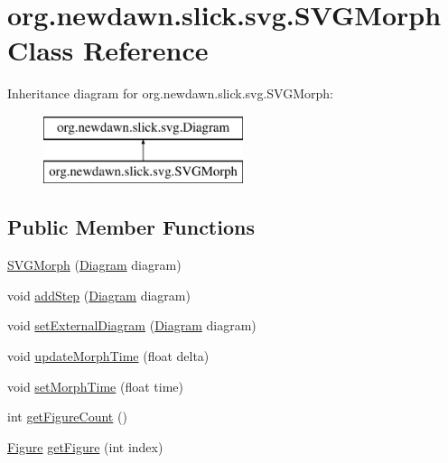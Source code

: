 \hypertarget{classorg_1_1newdawn_1_1slick_1_1svg_1_1_s_v_g_morph}{}\section{org.\+newdawn.\+slick.\+svg.\+S\+V\+G\+Morph Class Reference}
\label{classorg_1_1newdawn_1_1slick_1_1svg_1_1_s_v_g_morph}
Inheritance diagram for org.\+newdawn.\+slick.\+svg.\+S\+V\+G\+Morph\+:\begin{figure}[H]
\begin{center}
\leavevmode
\includegraphics[height=2.000000cm]{classorg_1_1newdawn_1_1slick_1_1svg_1_1_s_v_g_morph}
\end{center}
\end{figure}
\subsection*{Public Member Functions}
\begin{DoxyCompactItemize}
\item 
\mbox{\hyperlink{classorg_1_1newdawn_1_1slick_1_1svg_1_1_s_v_g_morph_a34006c6c880ef50451536a41e7a74fd2}{S\+V\+G\+Morph}} (\mbox{\hyperlink{classorg_1_1newdawn_1_1slick_1_1svg_1_1_diagram}{Diagram}} diagram)
\item 
void \mbox{\hyperlink{classorg_1_1newdawn_1_1slick_1_1svg_1_1_s_v_g_morph_ae23a44badfe2dd598ef09d4edfcbfb4d}{add\+Step}} (\mbox{\hyperlink{classorg_1_1newdawn_1_1slick_1_1svg_1_1_diagram}{Diagram}} diagram)
\item 
void \mbox{\hyperlink{classorg_1_1newdawn_1_1slick_1_1svg_1_1_s_v_g_morph_a7ae01b8d069c42d3c008bf36ce1af112}{set\+External\+Diagram}} (\mbox{\hyperlink{classorg_1_1newdawn_1_1slick_1_1svg_1_1_diagram}{Diagram}} diagram)
\item 
void \mbox{\hyperlink{classorg_1_1newdawn_1_1slick_1_1svg_1_1_s_v_g_morph_afba9cd5655c85ee202a36f57afdbb86d}{update\+Morph\+Time}} (float delta)
\item 
void \mbox{\hyperlink{classorg_1_1newdawn_1_1slick_1_1svg_1_1_s_v_g_morph_a2c74a6faaa71fd64eaee5a0848f29423}{set\+Morph\+Time}} (float time)
\item 
int \mbox{\hyperlink{classorg_1_1newdawn_1_1slick_1_1svg_1_1_s_v_g_morph_a0a4c1056e8d80f0d00ecfe06b90c2f06}{get\+Figure\+Count}} ()
\item 
\mbox{\hyperlink{classorg_1_1newdawn_1_1slick_1_1svg_1_1_figure}{Figure}} \mbox{\hyperlink{classorg_1_1newdawn_1_1slick_1_1svg_1_1_s_v_g_morph_aeef258b49ed563264f9686d542634d94}{get\+Figure}} (int index)
\end{DoxyCompactItemize}
